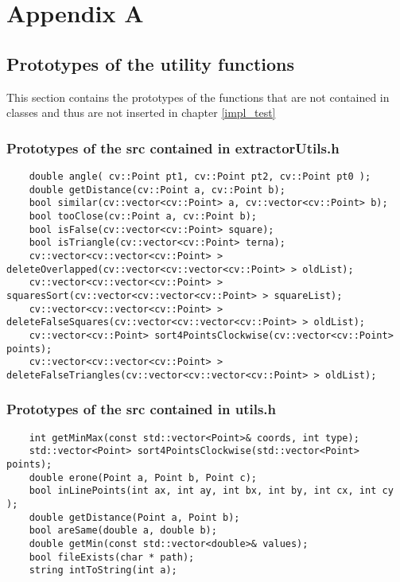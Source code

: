 \appendix
\chapter{Appendix A}\label{appA}

	\section{Prototypes of the utility functions}
	This section contains the prototypes of the functions that are not contained in classes and thus are not inserted in chapter \ref{impl_test}
	
	\subsection*{Prototypes of the src contained in extractorUtils.h}
	\begin{lstlisting}
	double angle( cv::Point pt1, cv::Point pt2, cv::Point pt0 );
	double getDistance(cv::Point a, cv::Point b);
	bool similar(cv::vector<cv::Point> a, cv::vector<cv::Point> b);
	bool tooClose(cv::Point a, cv::Point b);
	bool isFalse(cv::vector<cv::Point> square);
	bool isTriangle(cv::vector<cv::Point> terna);
	cv::vector<cv::vector<cv::Point> > deleteOverlapped(cv::vector<cv::vector<cv::Point> > oldList);
	cv::vector<cv::vector<cv::Point> > squaresSort(cv::vector<cv::vector<cv::Point> > squareList);
	cv::vector<cv::vector<cv::Point> > deleteFalseSquares(cv::vector<cv::vector<cv::Point> > oldList);
	cv::vector<cv::Point> sort4PointsClockwise(cv::vector<cv::Point> points);
	cv::vector<cv::vector<cv::Point> > deleteFalseTriangles(cv::vector<cv::vector<cv::Point> > oldList);
	\end{lstlisting}

	\subsection*{Prototypes of the src contained in utils.h}
	\begin{lstlisting}
	int getMinMax(const std::vector<Point>& coords, int type);
	std::vector<Point> sort4PointsClockwise(std::vector<Point> points);
	double erone(Point a, Point b, Point c);
	bool inLinePoints(int ax, int ay, int bx, int by, int cx, int cy );
	double getDistance(Point a, Point b);
	bool areSame(double a, double b);
	double getMin(const std::vector<double>& values);
	bool fileExists(char * path);
	string intToString(int a);
	\end{lstlisting}
